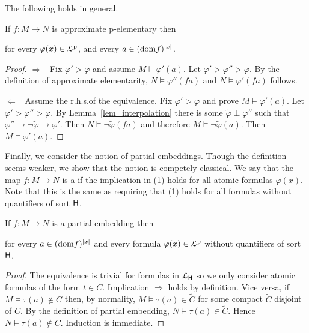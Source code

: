 \documentclass[10pt,oneside]{amsproc}
\renewcommand*{\emph}[1]{%
   \smash{\tikz[baseline]\node[rectangle, fill=teal!25, rounded corners, inner xsep=0.5ex, inner ysep=0.2ex, anchor=base, minimum height = 2.7ex]{\strut #1};}}
\begin{document}
The following holds in general.

\begin{fact}\label{fact_HImorphisms}
  If $f:M\to N$ is approximate p-elementary then


  for every $\varphi(x)\in{\EuScript L}^{\rm p}$, and every $a\in({\rm dom }f)^{|x|}$.
\end{fact}

\begin{proof}
  $\Rightarrow$ \ Fix $\varphi'>\varphi$ and assume $M\models\varphi'(a)$.
  Let  $\varphi'>\varphi''>\varphi$.
  By the definition of approximate elementarity, $N\models\varphi''(fa)$ and $N\models\varphi'(fa)$ follows.
  
  $\Leftarrow$  \ 
  Assume the r.h.s.\@ of the equivalence.
  Fix $\varphi'>\varphi$ and prove $M\models\varphi'(a)$.
  Let  $\varphi'>\varphi''>\varphi$.
  By Lemma~\ref{lem_interpolation} there is some $\tilde{\varphi}\perp\varphi''$ such that $\varphi''\rightarrow\neg\tilde{\varphi}\rightarrow\varphi'$.
  Then $N\models\neg\tilde{\varphi}(fa)$ and therefore  $M\models\neg\tilde{\varphi}(a)$.
  Then $M\models\varphi'(a)$.
\end{proof}

Finally, we consider the notion of partial embeddings.
Though the definition seems weaker, we show that the notion is competely classical.
We say that the map $f:M\to N$ is a \emph{partial embedding\/} if the implication in (1) holds for all atomic formulas $\varphi(x)$.
Note that this is the same as requiring that (1) holds for all formulas without quantifiers of sort ${\sf H}$.

\begin{fact}\label{fact_partial_emb}
  If $f:M\to N$ is a partial embedding then 


  for every $a\in({\rm dom }f)^{|x|}$ and every formula $\varphi(x)\in{\EuScript L}^{\rm p}$ without quantifiers of sort ${\sf H}$.
\end{fact}

\begin{proof}
  The equivalence is trivial for formulas in ${\EuScript L}_{\sf H}$ so we only consider atomic formulas of the form $t\in C$.
  Implication $\Rightarrow$ holds by definition. 
  Vice versa, if $M\models \tau(a)\notin C$ then, by normality,  $M\models \tau(a)\in\tilde{C}$ for some compact $\tilde C$ disjoint of $C$.
  By the definition of partial embedding, $N\models \tau(a)\in\tilde{C}$.
  Hence $N\models \tau(a)\notin C$.
  Induction is immediate.
\end{proof}
\end{document}
